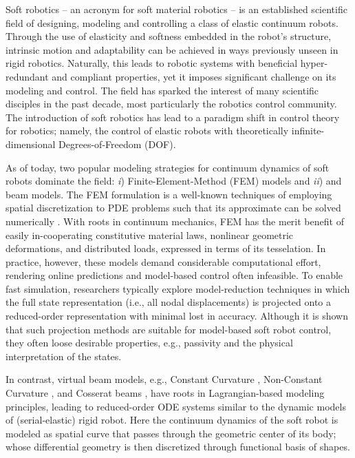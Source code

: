 Soft robotics -- an acronym for soft material robotics -- is an established scientific field of designing, modeling and controlling a class of elastic continuum robots. Through the use of elasticity and softness embedded in the robot's structure, intrinsic motion and adaptability can be achieved in ways previously unseen in rigid robotics. Naturally, this leads to robotic systems with beneficial hyper-redundant and compliant properties, yet it imposes significant challenge on its modeling and control. The field has sparked the interest of many scientific disciples in the past decade, most particularly the robotics control community. The introduction of soft robotics has lead to a paradigm shift in control theory for robotics; namely, the control of elastic robots with theoretically infinite-dimensional Degrees-of-Freedom (DOF).

As of today, two popular modeling strategies for continuum dynamics of soft robots dominate the field: \textit{i}) Finite-Element-Method (FEM) models and \textit{ii}) and beam models. The FEM formulation is a well-known techniques of employing spatial discretization to PDE problems such that its approximate can be solved numerically \cite{Kim2018,Coevoet2017}. With roots in continuum mechanics, FEM has the merit benefit of easily in-cooperating constitutive material laws, nonlinear geometric deformations, and distributed loads, expressed in terms of its tesselation. In practice, however, these models demand considerable computational effort, rendering online predictions and model-based control often infeasible. To enable fast simulation, researchers \cite{Coevoet2017,Duriez2013,Goury2018} typically explore model-reduction techniques in which the full state representation (i.e., all nodal displacements) is projected onto a reduced-order representation with minimal lost in accuracy. Although it is shown that such projection methods are suitable for model-based soft robot control, they often loose desirable properties, e.g., passivity and the physical interpretation of the states.

In contrast, virtual beam models, e.g., Constant Curvature \cite{Katzschmann2019}, Non-Constant Curvature \cite{Santina2020}, and Cosserat beams \cite{Boyer2019}, have roots in Lagrangian-based modeling principles, leading to reduced-order ODE systems similar to the dynamic models of (serial-elastic) rigid robot. Here the continuum dynamics of the soft robot is modeled as spatial curve that passes through the geometric center of its body; whose differential geometry is then discretized through functional basis of shapes.

